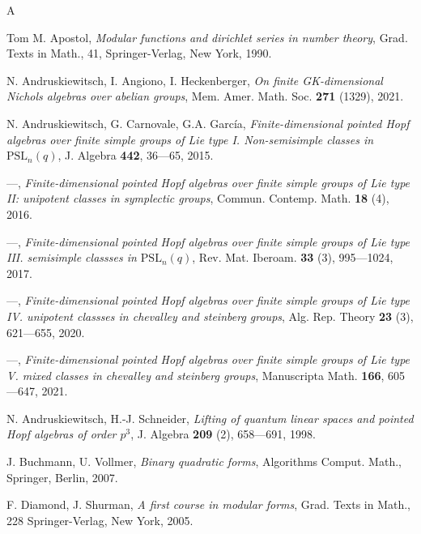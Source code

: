 \documentclass{amsproc}
\theoremstyle{definition}
\theoremstyle{remark}
\numberwithin{equation}{section}
\begin{document}

\begin{thebibliography}{A}


 Tom M. Apostol, \textit {Modular functions and dirichlet series in number theory},
Grad. Texts in Math., 41, Springer-Verlag, New York, 1990.


 N. Andruskiewitsch, I. Angiono, I. Heckenberger, \textit {On finite GK-dimensional Nichols algebras over
abelian groups}, Mem. Amer. Math. Soc. {\bf 271} (1329), 2021.

 N. Andruskiewitsch, G. Carnovale,  G.A. Garc\'{i}a, 
\textit {Finite-dimensional pointed Hopf algebras over finite simple groups of Lie type I. Non-semisimple classes in $\text{PSL}_n(q)$},
 J. Algebra {\bf 442}, 36---65, 2015.

 ---, \textit {Finite-dimensional pointed Hopf algebras over finite
    simple groups of Lie type II: unipotent classes in symplectic groups}, Commun. Contemp. Math.
    {\bf 18} (4), 2016.


 ---, \textit {Finite-dimensional pointed Hopf algebras over finite simple groups of Lie type III.
 semisimple classses in $\text{PSL}_n(q)$}, Rev. Mat. Iberoam. {\bf 33} (3), 995---1024, 2017.

 ---, \textit {Finite-dimensional pointed Hopf algebras over finite simple groups of Lie type IV. 
unipotent classses in chevalley and steinberg groups}, Alg. Rep. Theory {\bf 23} (3), 621---655, 2020.


 ---, \textit {Finite-dimensional pointed Hopf algebras over finite simple groups of Lie type V. 
mixed classes in chevalley and steinberg groups}, Manuscripta Math. {\bf 166}, 605---647, 2021.

 N. Andruskiewitsch, H.-J. Schneider, \textit {Lifting of quantum linear spaces and pointed Hopf 
algebras of order $p^3$}, J. Algebra {\bf 209} (2), 658---691, 1998.




 J. Buchmann, U. Vollmer, \textit {Binary quadratic forms}, Algorithms Comput. Math., Springer, Berlin, 2007.



 F. Diamond, J. Shurman, \textit {A first course in modular forms}, Grad. Texts in Math., 228
Springer-Verlag, New York, 2005.





\end{thebibliography}
\end{document}
